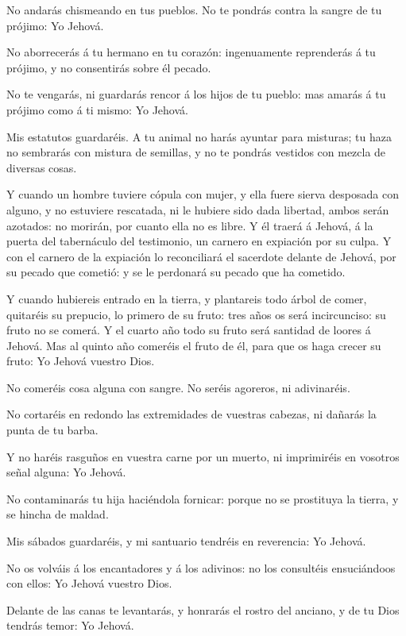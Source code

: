  No andarás chismeando en tus pueblos. No te pondrás contra
la sangre de tu prójimo: Yo Jehová.

 No aborrecerás á tu hermano en tu corazón: ingenuamente
reprenderás á tu prójimo, y no consentirás sobre él pecado.

 No te vengarás, ni guardarás rencor á los hijos de tu
pueblo: mas amarás á tu prójimo como á ti mismo: Yo Jehová.

 Mis estatutos guardaréis. A tu animal no harás ayuntar
para misturas; tu haza no sembrarás con mistura de semillas, y no te
pondrás vestidos con mezcla de diversas cosas.

 Y cuando un hombre tuviere cópula con mujer, y ella fuere
sierva desposada con alguno, y no estuviere rescatada, ni le hubiere
sido dada libertad, ambos serán azotados: no morirán, por cuanto ella no
es libre.  Y él traerá á Jehová, á la puerta del
tabernáculo del testimonio, un carnero en expiación por su culpa.
 Y con el carnero de la expiación lo reconciliará el
sacerdote delante de Jehová, por su pecado que cometió: y se le
perdonará su pecado que ha cometido.

 Y cuando hubiereis entrado en la tierra, y plantareis todo
árbol de comer, quitaréis su prepucio, lo primero de su fruto: tres años
os será incircunciso: su fruto no se comerá.  Y el cuarto
año todo su fruto será santidad de loores á Jehová.  Mas al
quinto año comeréis el fruto de él, para que os haga crecer su fruto: Yo
Jehová vuestro Dios.

 No comeréis cosa alguna con sangre. No seréis agoreros, ni
adivinaréis.

 No cortaréis en redondo las extremidades de vuestras
cabezas, ni dañarás la punta de tu barba.

 Y no haréis rasguños en vuestra carne por un muerto, ni
imprimiréis en vosotros señal alguna: Yo Jehová.

 No contaminarás tu hija haciéndola fornicar: porque no se
prostituya la tierra, y se hincha de maldad.

 Mis sábados guardaréis, y mi santuario tendréis en
reverencia: Yo Jehová.

 No os volváis á los encantadores y á los adivinos: no los
consultéis ensuciándoos con ellos: Yo Jehová vuestro Dios.

 Delante de las canas te levantarás, y honrarás el rostro
del anciano, y de tu Dios tendrás temor: Yo Jehová.

